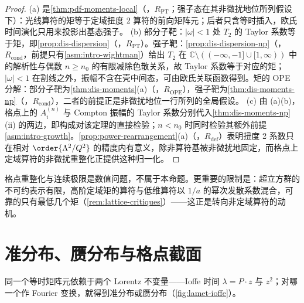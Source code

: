 \begin{proof}
(a) 是\cref{thm:pdf-moments-local}（\tagR，$R_{\mathrm{PT}}$；强子态在其非微扰地位所列假设下）：光线算符的矩等于定域扭度 2 算符的前向矩阵元；后者只含等时插入，欧氏时间演化只用来投影出基态强子。
(b) 部分子靶：$|\omega|<1$ 处 $T_2$ 的 Taylor 系数等于矩，即\cref{prop:dis-dispersion}（\tagR，$R_{\mathrm{PT}}$）。强子靶：\cref{prop:dis-dispersion-np}（\tagR，$R_{\mathrm{cond}}$，前提只有\cref{asm:intro-wightman}）给出 $T_2$ 在 $\mathbb C\setminus((-\infty,-1]\cup[1,\infty))$ 中的解析性与偶数 $n\ge n_0$ 的有限减除色散关系，故 Taylor 系数等于对应的矩；$|\omega|<1$ 在割线之外，振幅不含在壳中间态，可由欧氏关联函数得到。矩的 OPE 分解：部分子靶为\cref{thm:dis-moments}(a)（\tagR，$R_{\mathrm{OPE}}$），强子靶为\cref{thm:dis-moments-np}（\tagR，$R_{\mathrm{cond}}$），二者的前提正是非微扰地位一行所列的全局假设。
(c) 由 (a)(b)，格点上的 $A^{(n)}_i$ 与 Compton 振幅的 Taylor 系数分别代入\cref{thm:dis-moments-np}(ii) 的两边，即构成对该定理的直接检验；$n<n_0$ 时同时检验其额外前提\cref{asm:intro-growth}。\cref{prop:power-rearrangement}(a)（\tagR，$R_{\mathrm{def}}$）表明扭度 2 系数只在相对 $\order{\Lambda^2/Q^2}$ 的精度内有意义，除非算符基被非微扰地固定，而格点上定域算符的非微扰重整化正提供这种归一化。
\end{proof}

格点重整化与连续极限是数值问题，不属于本命题。更重要的限制是：超立方群的不可约表示有限，高阶定域矩的算符与低维算符以 $1/a$ 的幂次发散系数混合，可靠的只有最低几个矩（\cref{rem:lattice-critiques}）——这正是转向非定域算符的动机。

\section{准分布、赝分布与格点截面}\label{sec:lattice-quasi}

同一个等时矩阵元依赖于两个 Lorentz 不变量——Ioffe 时间 $\lambda=P\cdot z$ 与 $z^2$；对哪一个作 Fourier 变换，就得到准分布或赝分布（\cref{fig:lamet-ioffe}）。

